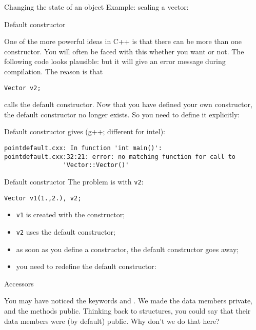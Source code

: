 \begin{block}{Changing the state of an object}
  \label{sl:state-method}
  Example: scaling a vector:
\end{block}

 {Default constructor}
\label{sec:default-constructor}

One of the more powerful ideas in C++ is that there can be more than
one constructor. You will often be faced with this whether you want or
not. The following code looks plausible:
%
%
but it will give an error message during compilation. The reason is
that 
\begin{lstlisting}
Vector v2;
\end{lstlisting}
calls the default constructor. Now that you have defined your own
constructor, the default constructor no longer exists. So you need to
define it explicitly:
%

\begin{slide}{Default constructor}
  \label{sl:obj-def-construct1}
  gives (g++; different for intel):
\begin{lstlisting}
pointdefault.cxx: In function 'int main()':
pointdefault.cxx:32:21: error: no matching function for call to
                'Vector::Vector()'
\end{lstlisting}
\end{slide}

\begin{slide}{Default constructor}
  \label{sl:obj-def-construct2}
  The problem is with \lstinline{v2}:
\begin{lstlisting}
Vector v1(1.,2.), v2;    
\end{lstlisting}
\begin{itemize}
\item \lstinline{v1} is created with the constructor;
\item \lstinline{v2} uses the default constructor;
\item as soon as you define a constructor, the default constructor
  goes away;
\item you need to redefine the default constructor:
\end{itemize}
\end{slide}

 {Accessors}

You may have noticed the keywords  and
. We made the data members private, and the
methods public. Thinking back to structures, you could say that their
data members were (by default) public. Why don't we do that here?

